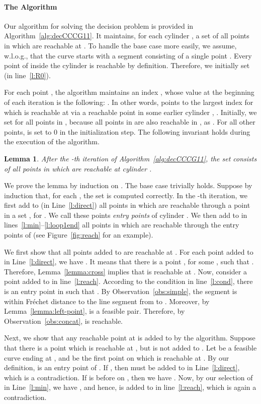 \documentclass[12pt]{dalthesis}
\def\favoritefont{\bfseries \sffamily}
\def\QED{\ensuremath{{\Box}}}
\def\markatright#1{\leavevmode\unskip\nobreak\quad\hspace*{\fill}{#1}}
\newenvironment{proof}
	{\begin{trivlist}\item[\hskip\labelsep{\favoritefont Proof:}]}
	{\markatright{\QED}\end{trivlist}}
\newtheorem{lemma}[theorem]{Lemma}
\newcommand{\Frechet}{Fr\'echet }
\begin{document}
\paragraph{The Algorithm}
Our algorithm for solving the decision problem is provided in Algorithm~\ref{alg:decCCCG11}.
It maintains,
for each cylinder , a set  of all points in  which are reachable at .
To handle the base case more easily,
we assume, w.l.o.g., that the curve  starts with a segment   
consisting of a single point .
Every point of  inside the cylinder  is reachable by definition.
Therefore, we initially set  (in line~\ref{l:R0}).

For each point , the algorithm maintains an index , 
whose value at the beginning of each iteration  is the following:
.
In other words,  points to the largest index  for which  is reachable at 
via a reachable point  in some earlier cylinder , .
Initially, we set  for all points in ,
because all points in  are also reachable in , as .
For all other points,  is set to 0 in the initialization step.
The following invariant holds during the execution of the algorithm.

\begin{lemma}\label{lemma:main}
	After the -th iteration of Algorithm~\ref{alg:decCCCG11}, 
	the set  consists of all points in  which are reachable at cylinder .
\end{lemma}


\begin{proof}
	We prove the lemma by induction on .
	The base case  trivially holds.
	Suppose by induction that, for each ,
	the set  is computed correctly.
	In the -th iteration,
	we first add to  (in Line~\ref{l:direct}) all points in 
	which are reachable through a point in a set , for .
	We call these points \emph{entry points} of cylinder .
	We then add to  in lines~\ref{l:min}--\ref{l:loop1end} all points in 
	which are reachable through the entry points of 
	(see Figure~\ref{fig:reach} for an example).

	We first show that all points added to  are reachable at .
	For each point  added to  in Line~\ref{l:direct},
	we have . 
	It means that there is a point , for some , such that . 
	Therefore, Lemma~\ref{lemma:cross} implies that  is reachable at .
	Now, consider a point  added to  in line~\ref{l:reach}.
	According to the condition in line~\ref{l:cond}, 
	there is an entry point  in  such that
	.
	By Observation~\ref{obs:simple}, the segment  is 
	within  \Frechet distance to the line segment
	from  to . 
	Moreover, by Lemma~\ref{lemma:left-point},  is a feasible pair.
	Therefore, by Observation~\ref{obs:concat},
	 is reachable.
	
	Next, we show that
	any reachable point at  is added to  by the algorithm.
	Suppose that there is 
	a point  which is reachable at ,
	but is not added to .
	Let  be a feasible curve ending at ,
	and  be the first point on  which is reachable at .
	By our definition,  is an entry point of .
	If , then  must be added to  in Line~\ref{l:direct},
	which is a contradiction.
	If  is before  on ,
	then we have .
	Now, by our selection of  in Line~\ref{l:min},
	we have ,
	and hence,  is added to  in line~\ref{l:reach},
	which is again a contradiction.
\end{proof}
\end{document}

